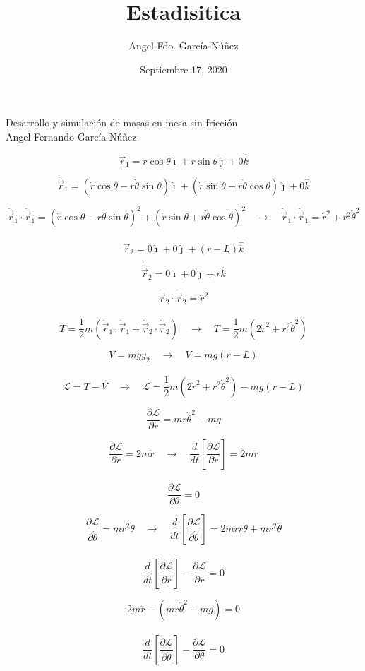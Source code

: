 \documentclass[10pt,a4papper]{article}
\author{Angel Fdo. García Núñez}
\date{Septiembre 17, 2020}
\title{Estadisitica}
\begin{document}
\Huge
Desarrollo y simulación de masas en mesa sin
fricción\\

Angel Fernando García Núñez

\Large
\newpage
\[\vec r_1=r\cos\theta\hat\imath+r\sin\theta\hat\jmath+0\hat k\]

\[\dot{\vec r}_1=(\dot r\cos\theta-r\dot\theta\sin\theta)\hat\imath+(\dot r\sin\theta+r\dot\theta\cos\theta)\hat\jmath+0\hat k\]

\[\dot{\vec r}_1\cdot\dot{\vec r}_1=(\dot r\cos\theta-r\dot\theta\sin\theta)^2+(\dot r\sin\theta+r\dot\theta\cos\theta)^2\quad\to\quad
\dot{\vec r}_1\cdot\dot{\vec r}_1=\dot r^2+r^2\dot\theta^2\]\\

\[\vec r_2=0\hat\imath+0\hat\jmath+(r-L)\hat k\]

\[\dot{\vec r}_2=0\hat\imath+0\hat\jmath+\dot r\hat k\]

\[\dot{\vec r}_2\cdot\dot{\vec r}_2=\dot r^2\]\\

\[T=\frac{1}{2}m(\dot{\vec r}_1\cdot\dot{\vec r}_1+\dot{\vec r}_2\cdot\dot{\vec r}_2)\quad\to\quad
T=\frac{1}{2}m(2\dot r^2+r^2\dot\theta^2)\]

\[V=mgy_2\quad\to\quad V=mg(r-L)\]\\

\[\mathcal{L}=T-V\quad\to\quad\mathcal{L}=\frac{1}{2}m(2\dot r^2+r^2\dot\theta^2)-mg(r-L)\]

\newpage
\[\frac{\partial\mathcal{L}}{\partial r}=mr\dot\theta^2-mg\]

\[\frac{\partial\mathcal{L}}{\partial\dot r}=2m\dot r\quad\to\quad
\frac{d}{dt}\left[\frac{\partial\mathcal{L}}{\partial\dot r}\right]=2m\ddot r\]\\

\[\frac{\partial\mathcal{L}}{\partial\theta}=0\]

\[\frac{\partial\mathcal{L}}{\partial\dot\theta}=mr^2\dot\theta\quad\to\quad
\frac{d}{dt}\left[\frac{\partial\mathcal{L}}{\partial\dot\theta}\right]=2mr\dot r\dot\theta+mr^2\ddot\theta\]\\

\[\frac{d}{dt}\left[\frac{\partial\mathcal{L}}{\partial\dot r}\right]-\frac{\partial\mathcal{L}}{\partial r}=0\]

\[2m\ddot r-(mr\dot\theta^2-mg)=0\]\\

\[\frac{d}{dt}\left[\frac{\partial\mathcal{L}}{\partial\dot\theta}\right]-\frac{\partial\mathcal{L}}{\partial\theta}=0\]
\end{document}
